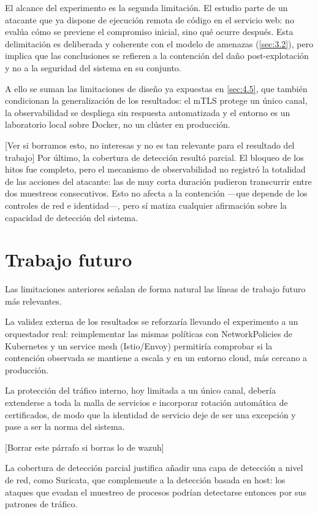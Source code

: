 \documentclass[11pt,spanish,listoffigures,listoftables]{tfgetsinf}
\begin{document}
        El alcance del experimento es la segunda limitación. El estudio parte de un atacante que ya dispone de ejecución remota de código en el servicio web: no evalúa cómo se previene el compromiso inicial, sino qué ocurre después. Esta delimitación es deliberada y coherente con el modelo de amenazas (\cref{sec:3.2}), pero implica que las conclusiones se refieren a la contención del daño post-explotación y no a la seguridad del sistema en su conjunto.

        A ello se suman las limitaciones de diseño ya expuestas en \cref{sec:4.5}, que también condicionan la generalización de los resultados: el mTLS protege un único canal, la observabilidad se despliega sin respuesta automatizada y el entorno es un laboratorio local sobre Docker, no un clúster en producción.

        [Ver si borramos esto, no interesas y no es tan relevante para el resultado del trabajo]
        Por último, la cobertura de detección resultó parcial. El bloqueo de los hitos fue completo, pero el mecanismo de observabilidad no registró la totalidad de las acciones del atacante: las de muy corta duración pudieron transcurrir entre dos muestreos consecutivos. Esto no afecta a la contención —que depende de los controles de red e identidad—, pero sí matiza cualquier afirmación sobre la capacidad de detección del sistema.

        \section{Trabajo futuro}
        Las limitaciones anteriores señalan de forma natural las líneas de trabajo futuro más relevantes.

        La validez externa de los resultados se reforzaría llevando el experimento a un orquestador real: reimplementar las mismas políticas con NetworkPolicies de Kubernetes y un service mesh (Istio/Envoy) permitiría comprobar si la contención observada se mantiene a escala y en un entorno cloud, más cercano a producción.
        
        La protección del tráfico interno, hoy limitada a un único canal, debería extenderse a toda la malla de servicios e incorporar rotación automática de certificados, de modo que la identidad de servicio deje de ser una excepción y pase a ser la norma del sistema.

        [Borrar este párrafo si borras lo de wazuh]
        
        La cobertura de detección parcial justifica añadir una capa de detección a nivel de red, como Suricata, que complemente a la detección basada en host: los ataques que evadan el muestreo de procesos podrían detectarse entonces por sus patrones de tráfico.
        
\end{document}
